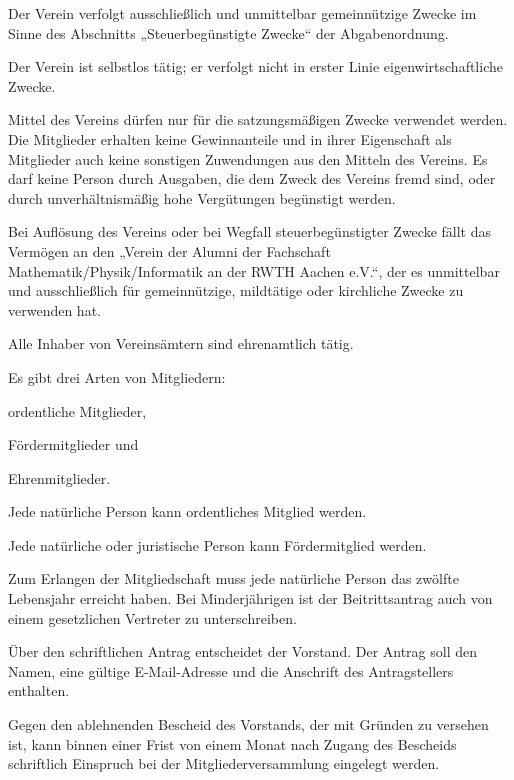 \begin{contract}
Der Verein verfolgt ausschließlich und unmittelbar gemeinnützige Zwecke im Sinne des Abschnitts „Steuerbegünstigte Zwecke“ der Abgabenordnung.
       
Der Verein ist selbstlos tätig; er verfolgt nicht in erster Linie eigen\-wirtschaftliche Zwecke.
       
Mittel des Vereins dürfen nur für die satzungsmäßigen Zwecke verwendet werden. Die Mitglieder erhalten keine Gewinnanteile und in ihrer Eigenschaft als Mitglieder auch keine sonstigen Zuwendungen aus den Mitteln des Vereins. Es darf keine Person durch Ausgaben, die dem Zweck des Vereins fremd sind, oder durch unverhältnismäßig hohe Vergütungen begünstigt werden.
       
Bei Auflösung des Vereins oder bei Wegfall steuerbegünstigter Zwecke fällt das Vermögen an den „Verein der Alumni der Fachschaft Mathematik/Physik/Informatik an der RWTH Aachen e.V.“, der es unmittelbar und ausschließlich für gemeinnützige, mildtätige oder kirchliche Zwecke zu verwenden hat.
       
Alle Inhaber von Vereinsämtern sind ehrenamtlich tätig.

Es gibt drei Arten von Mitgliedern:
	\begin{subpara}
	\item ordentliche Mitglieder,
	\item Fördermitglieder und
	\item Ehrenmitglieder.
	\end{subpara}

	
 Jede natürliche Person kann ordentliches Mitglied werden.
	
 Jede natürliche oder juristische Person kann Fördermitglied werden.
	
 Zum Erlangen der Mitgliedschaft muss jede natürliche Person das zwölfte Lebensjahr erreicht haben. Bei Minderjährigen ist der Beitrittsantrag auch von einem gesetzlichen Vertreter zu unterschreiben.
	
 Über den schriftlichen Antrag entscheidet der Vorstand. Der Antrag soll den Namen, eine gültige E-Mail-Adresse und die Anschrift des Antragstellers ent\-halten.
	
 Gegen den ablehnenden Bescheid des Vorstands, der mit Gründen zu versehen ist, kann binnen einer Frist von einem Monat nach Zugang des Bescheids schriftlich Einspruch bei der Mitgliederversammlung eingelegt werden.
	

\end{contract}
